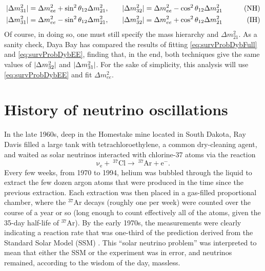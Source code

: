 \documentclass[../thesis.tex]{subfiles}
\begin{document}
\begin{align*}
  \lvert \Delta m^2_{31}\rvert = \Delta m^2_{ee} + \sin^2 \theta_{12} \Delta m^2_{21}, \qquad
  & \lvert \Delta m^2_{32}\rvert = \Delta m^2_{ee} - \cos^2 \theta_{12} \Delta m^2_{21} \qquad
  & \text{(NH)}\\
  \lvert \Delta m^2_{31}\rvert = \Delta m^2_{ee} - \sin^2 \theta_{12} \Delta m^2_{21}, \qquad
  & \lvert \Delta m^2_{32}\rvert = \Delta m^2_{ee} + \cos^2 \theta_{12} \Delta m^2_{21} \qquad
  & \text{(IH)}
\end{align*}
Of course, in doing so, one must still specify the mass hierarchy and \(\Delta m^2_{21}.\) As a sanity check, Daya Bay has compared the results of fitting \eqref{eq:survProbDybFull} and \eqref{eq:survProbDybEE}, finding that, in the end, both techniques give the same values of \(\lvert \Delta m^2_{32}\rvert\) and \(\lvert \Delta m^2_{31}\rvert\). For the sake of simplicity, this analysis will use \eqref{eq:survProbDybEE} and fit \(\Delta m^2_{ee}\).

\section{History of neutrino oscillations}
\label{sec:history}

In the late 1960s, deep in the Homestake mine located in South Dakota, Ray Davis filled a large tank with tetrachloroethylene, a common dry-cleaning agent, and waited as solar neutrinos interacted with chlorine-37 atoms via the reaction
\begin{equation}
  \mathrm{\nu_e + \ ^{37}Cl \longrightarrow \ ^{37}Ar + e^-.}  
\end{equation}
Every few weeks, from 1970 to 1994, helium was bubbled through the liquid to extract the few dozen argon atoms that were produced in the time since the previous extraction. Each extraction was then placed in a gas-filled proportional chamber, where the $^{37}$Ar decays (roughly one per week) were counted over the course of a year or so (long enough to count effectively all of the atoms, given the 35-day half-life of $^{37}$Ar). By the early 1970s, the measurements were clearly indicating a reaction rate that was one-third of the prediction derived from the Standard Solar Model (SSM) \cite{DAVIS199413}. This ``solar neutrino problem'' was interpreted to mean that either the SSM or the experiment was in error, and neutrinos remained, according to the wisdom of the day, massless.
\end{document}
